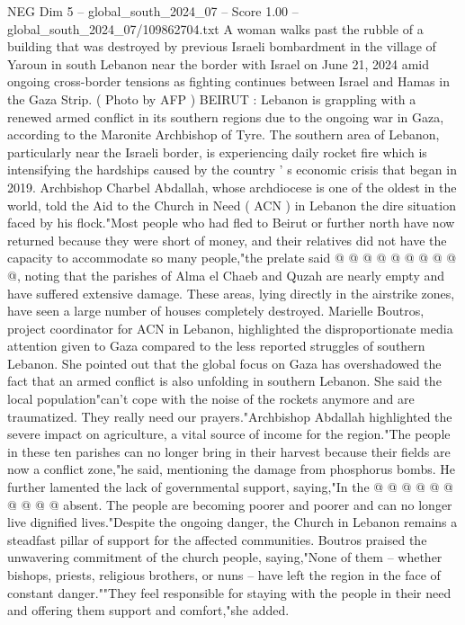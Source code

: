 \begin{textsample}{NEG Dim 5 – global\_south\_2024\_07 – Score 1.00 – global\_south\_2024\_07/109862704.txt}  \label{ex:f5_neg_279}
A woman walks past the rubble of a building that was destroyed by previous Israeli bombardment in the village of Yaroun in south Lebanon near the border with Israel on June 21, 2024 amid ongoing cross-border tensions as fighting continues between Israel and Hamas in the Gaza Strip. ( Photo by AFP ) BEIRUT : Lebanon is grappling with a renewed armed conflict in its southern regions due to the ongoing war in Gaza, according to the Maronite Archbishop of Tyre.
The southern area of Lebanon, particularly near the Israeli border, is experiencing daily rocket fire which is intensifying the hardships caused by the country ' s economic crisis that began in 2019.
Archbishop Charbel Abdallah, whose archdiocese is one of the oldest in the world, told the Aid to the Church in Need ( ACN ) in Lebanon the dire situation faced by his flock."Most people who had fled to Beirut or further north have now returned because they were short of money, and their relatives did not have the capacity to accommodate so many people,"the prelate said @ @ @ @ @ @ @ @ @ @, noting that the parishes of Alma el Chaeb and Quzah are nearly empty and have suffered extensive damage.
These areas, lying directly in the airstrike zones, have seen a large number of houses completely destroyed.
Marielle Boutros, project coordinator for ACN in Lebanon, highlighted the disproportionate media attention given to Gaza compared to the less reported struggles of southern Lebanon.
She pointed out that the global focus on Gaza has overshadowed the fact that an armed conflict is also unfolding in southern Lebanon.
She said the local population"can't cope with the noise of the rockets anymore and are traumatized.
They really need our prayers."Archbishop Abdallah highlighted the severe impact on agriculture, a vital source of income for the region."The people in these ten parishes can no longer bring in their harvest because their fields are now a conflict zone,"he said, mentioning the damage from phosphorus bombs.
He further lamented the lack of governmental support, saying,"In the @ @ @ @ @ @ @ @ @ @ absent.
The people are becoming poorer and poorer and can no longer live dignified lives."Despite the ongoing danger, the Church in Lebanon remains a steadfast pillar of support for the affected communities.
Boutros praised the unwavering commitment of the church people, saying,"None of them -- whether bishops, priests, religious brothers, or nuns -- have left the region in the face of constant danger.""They feel responsible for staying with the people in their need and offering them support and comfort,"she added.

\end{textsample}
